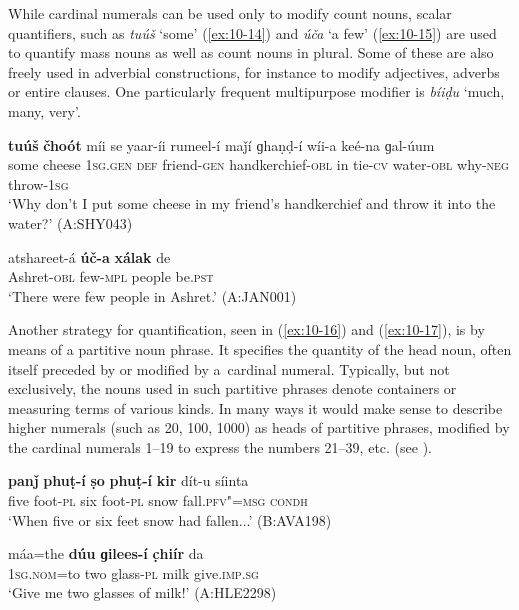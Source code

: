 While cardinal numerals can be used only to modify count nouns, scalar quantifiers, such as \textit{tuúš} `some' (\ref{ex:10-14}) and \textit{úča} `a few' (\ref{ex:10-15}) are used to quantify mass nouns as well as count nouns in plural. Some of these are also freely used in adverbial constructions, for instance to modify adjectives, adverbs or entire clauses. One particularly frequent multipurpose modifier is \textit{bíiḍu} `much, many, very'.
\begin{exe}
\ex
\label{ex:10-14}
\gll \textbf{tuúš} \textbf{čhoót} míi se yaar-íi rumeel-í maǰí ɡhaṇḍ-í wíi-a keé-na ɡal-úum\\
some cheese \textsc{1sg.gen} \textsc{def} friend-\textsc{gen} handkerchief-\textsc{obl}  in tie-\textsc{cv} water-\textsc{obl} why-\textsc{neg} throw-\textsc{1sg} \\
\glt `Why don't I put some cheese in my friend's handkerchief and throw it into the water?' (A:SHY043)

\ex
\label{ex:10-15}
\gll atshareet-á \textbf{úč-a} \textbf{xálak} de \\
Ashret-\textsc{obl} few-\textsc{mpl} people be.\textsc{pst}\\
\glt `There were few people in Ashret.' (A:JAN001)
\end{exe}


Another strategy for quantification, seen in (\ref{ex:10-16}) and (\ref{ex:10-17}), is by means of a partitive noun phrase. It specifies the quantity of the head noun, often itself preceded by or modified by a~cardinal numeral. Typically, but not exclusively, the nouns used in such partitive phrases denote containers or measuring terms of various kinds. In many ways it would make sense to describe higher numerals (such as 20, 100, 1000) as heads of partitive phrases, modified by the cardinal numerals 1--19 to express the numbers 21--39, etc. (see ).

\begin{exe}
\ex
\label{ex:10-16}
\gll \textbf{panǰ} \textbf{phuṭ-í} \textbf{ṣo} \textbf{phuṭ-í} \textbf{kir} dít-u síinta \\
five foot-\textsc{pl} six foot-\textsc{pl} snow fall.\textsc{pfv"=msg} \textsc{condh} \\
\glt `When five or six feet snow had fallen...' (B:AVA198)

\ex
\label{ex:10-17}
\gll máa=the \textbf{dúu} \textbf{ɡilees-í} \textbf{c̣hiír} da \\
\textsc{1sg}.\textsc{nom}=to two glass-\textsc{pl} milk give.\textsc{imp.sg} \\
\glt `Give me two glasses of milk!' (A:HLE2298)
\end{exe}


